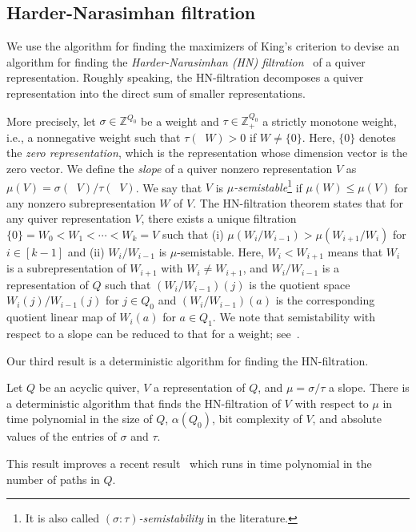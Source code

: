 \documentclass[a4paper,11pt]{article}
\numberwithin{equation}{section}
\newcommand{\Z}{\mathbb{Z}}
\DeclareMathOperator{\dimv}{\underline{dim}}
\begin{document}
\subsection{Harder-Narasimhan filtration}\label{subsec:intro:HN-filtration}
We use the algorithm for finding the maximizers of King's criterion to devise an algorithm for finding the \emph{Harder-Narasimhan (HN) filtration}~\cite{Harder1975,Hille2002} of a quiver representation.
Roughly speaking, the HN-filtration decomposes a quiver representation into the direct sum of smaller representations.

More precisely, let $\sigma \in \Z^{Q_0}$ be a weight and $\tau \in \Z_+^{Q_0}$ a strictly monotone weight, i.e., a nonnegative weight such that $\tau(\dimv W) > 0$ if $W \neq \{0\}$.
Here, $\{0\}$ denotes the \emph{zero representation}, which is the representation whose dimension vector is the zero vector.
We define the \emph{slope} of a quiver nonzero representation $V$ as $\mu(V) = \sigma(\dimv V)/\tau(\dimv V)$.
We say that $V$ is \emph{$\mu$-semistable}\footnote{It is also called \emph{$(\sigma:\tau)$-semistability} in the literature.} if $\mu(W) \leq \mu(V)$ for any nonzero subrepresentation $W$ of $V$.
The HN-filtration theorem states that for any quiver representation $V$, there exists a unique filtration $\{0\} = W_0 < W_1 < \cdots < W_k = V$ such that (i) $\mu(W_i/W_{i-1}) > \mu(W_{i+1}/ W_i)$ for $i \in [k-1]$ and (ii) $W_i/W_{i-1}$ is $\mu$-semistable.
Here,  $W_i < W_{i+1}$ means that $W_i$ is a subrepresentation of $W_{i+1}$ with $W_i \ne W_{i+1}$, and $W_i/W_{i-1}$ is a representation of $Q$ such that $(W_i/W_{i-1})(j)$ is the quotient space $W_i(j)/W_{i-1}(j)$ for $j \in Q_0$ and $(W_i/W_{i-1})(a)$ is the corresponding quotient linear map of $W_i(a)$ for $a \in Q_1$.
We note that semistability with respect to a slope can be reduced to that for a weight; see~.

Our third result is a deterministic algorithm for finding the HN-filtration.

\begin{theorem}
    Let $Q$ be an acyclic quiver, $V$ a representation of $Q$, and $\mu = \sigma/\tau$ a slope.
    There is a deterministic algorithm that finds the HN-filtration of $V$ with respect to $\mu$ in time polynomial in the size of $Q$, $\alpha(Q_0)$, bit complexity of $V$, and absolute values of the entries of $\sigma$ and $\tau$.
\end{theorem}

This result improves a recent result~\cite{Cheng2024} which runs in time polynomial in the number of paths in $Q$.
\end{document}
